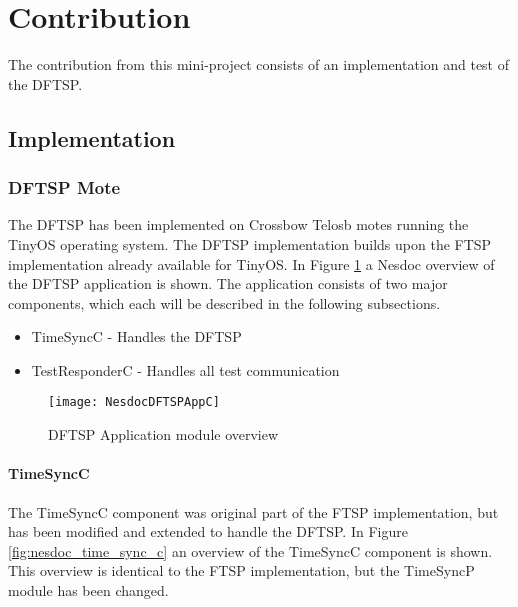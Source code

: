 \documentclass[Main]{subfiles}
\begin{document}
\section{Contribution} %
\label{sec:contribution}

	The contribution from this mini-project consists of an implementation and test of the DFTSP.
	\subsection{Implementation} %
	\label{sub:implementation}

		\subsubsection{DFTSP Mote} %
		\label{sub:dftsp_mote}
			The DFTSP has been implemented on Crossbow Telosb motes\cite{TelosBDatasheet:Online} running the TinyOS\cite{TinyOS:Online} operating system. 
			The DFTSP implementation builds upon the FTSP implementation already available for TinyOS\cite{FTSPImplementationTinyOS:Online}.
			In Figure \ref{fig:nesdoc_dstfp_app_c} a Nesdoc\cite{Nesdoc:Online} overview of the DFTSP application is shown. 
			The application consists of two major components, which each will be described in the following subsections.
			
			\begin{itemize}
			 	\item TimeSyncC - Handles the DFTSP
			 	\item TestResponderC - Handles all test communication
			\end{itemize}

			\begin{figure}[H]
				\centering
				\texttt{[image: NesdocDFTSPAppC]}
				\caption{DFTSP Application module overview}
				\label{fig:nesdoc_dstfp_app_c}
			\end{figure}

			\paragraph{TimeSyncC} %
			\label{par:timesyncc}
				The TimeSyncC component was original part of the FTSP implementation, but has been modified and extended to handle the DFTSP.
				In Figure \ref{fig:nesdoc_time_sync_c} an overview of the TimeSyncC component is shown.
				This overview is identical to the FTSP implementation, but the TimeSyncP module has been changed.
\end{document}
